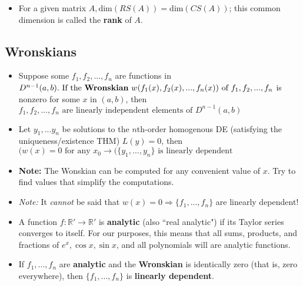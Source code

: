 \documentclass[10pt,letterpaper]{article}
\begin{document}
\begin{itemize}
\item For a given matrix $A, \mbox{dim}(RS(A)) = \mbox{dim}(CS(A))$; this common dimension is called the \textbf{rank} of $A$. 

\end{itemize}

\subsection*{Wronskians} %

\begin{itemize}
\item Suppose some $f_1, f_2,...,f_n$ are functions in $D^{n-1}(a,b).\mbox{ If the \textbf{Wronskian} }w(f_1(x),f_2(x),...,f_n(x)) \mbox{ of } f_1,f_2,...,f_n$
is nonzero for some $x$ in $(a,b)$, then $f_1, f_2, ...,f_n \mbox{ are linearly independent elements of }D^{n-1}(a,b)$

\item Let $y_1,...y_n$ be solutions to the $n$th-order homogenous DE (satisfying the uniqueness/existence THM)
$L(y)=0$, then 
\\ $(w(x)=0 \mbox{ for any }x_0\rightarrow (\{y_1,...,y_n\}\mbox{ is linearly dependent }$
\item \textbf{Note:} The Wonskian can be computed for any convenient value of $x$. 
Try to find values that simplify the computations. 

\item \textit{Note:} It \textit{cannot} be said that $w(x)=0\Rightarrow\{f_1,...,f_n\}$ are linearly dependent!

\item A function $f: \mathbb{R}' \rightarrow \mathbb{R}'$ is \textbf{analytic} (also ``real analytic") if its Taylor series converges to itself. For our purposes, this means that all sums, products, and fractions of $e^x, \cos x, \sin x$, and all polynomials will are analytic functions. 

\item If $f_1,...,f_n$ are \textbf{analytic }and the \textbf{Wronskian }is identically zero (that is, zero everywhere), then  $\{f_1,...,f_n\}$ is \textbf{linearly dependent}. 

\iffalse 
\item If $\{y_1,...,y_n\}$ are solutions to the $n$th order linear homogenous DE $L(y)=0$, 
then: 
\begin{enumerate}
\item The Wronskian is always 0, functions are linearly dependent 
\item The Wronskian is never 0, functions are linearly independent 
\end{enumerate} %
\fi 
\end{itemize}
\end{document}
